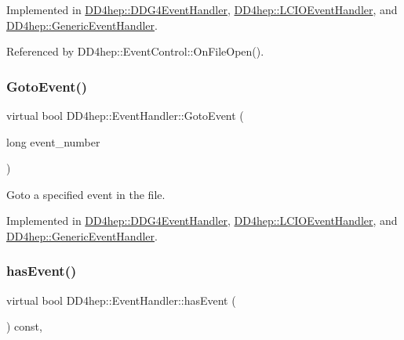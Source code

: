 Implemented in \hyperlink{class_d_d4hep_1_1_d_d_g4_event_handler_a8447b4fc24290d4f1539fbda65a0cbf3}{D\+D4hep\+::\+D\+D\+G4\+Event\+Handler}, \hyperlink{class_d_d4hep_1_1_l_c_i_o_event_handler_ace6d753b27597445ebfe9e77f1c1afcf}{D\+D4hep\+::\+L\+C\+I\+O\+Event\+Handler}, and \hyperlink{class_d_d4hep_1_1_generic_event_handler_a3d99aeaf1bcd8aa421ecab3bcf5fabe0}{D\+D4hep\+::\+Generic\+Event\+Handler}.



Referenced by D\+D4hep\+::\+Event\+Control\+::\+On\+File\+Open().

\hypertarget{class_d_d4hep_1_1_event_handler_a09c40b0b753455c1e3df7c561ff6b069}{}\label{class_d_d4hep_1_1_event_handler_a09c40b0b753455c1e3df7c561ff6b069} 
\subsubsection{\texorpdfstring{Goto\+Event()}{GotoEvent()}}
{\footnotesize\ttfamily virtual bool D\+D4hep\+::\+Event\+Handler\+::\+Goto\+Event (\begin{DoxyParamCaption}\item[{long}]{event\+\_\+number }\end{DoxyParamCaption})\hspace{0.3cm}{\ttfamily [pure virtual]}}



Goto a specified event in the file. 



Implemented in \hyperlink{class_d_d4hep_1_1_d_d_g4_event_handler_a3af4cf3191fabf450e81812e93d2502a}{D\+D4hep\+::\+D\+D\+G4\+Event\+Handler}, \hyperlink{class_d_d4hep_1_1_l_c_i_o_event_handler_af7089e4660ace0f0a4da544bb39660e5}{D\+D4hep\+::\+L\+C\+I\+O\+Event\+Handler}, and \hyperlink{class_d_d4hep_1_1_generic_event_handler_a7a7c4d1592e5b2d467a426058aa1a44b}{D\+D4hep\+::\+Generic\+Event\+Handler}.

\hypertarget{class_d_d4hep_1_1_event_handler_ad07cc15bff3dc3fc70cf37d2deefe3b7}{}\label{class_d_d4hep_1_1_event_handler_ad07cc15bff3dc3fc70cf37d2deefe3b7} 
\subsubsection{\texorpdfstring{has\+Event()}{hasEvent()}}
{\footnotesize\ttfamily virtual bool D\+D4hep\+::\+Event\+Handler\+::has\+Event (\begin{DoxyParamCaption}{ }\end{DoxyParamCaption}) const\hspace{0.3cm}{\ttfamily [inline]}, {\ttfamily [virtual]}}



